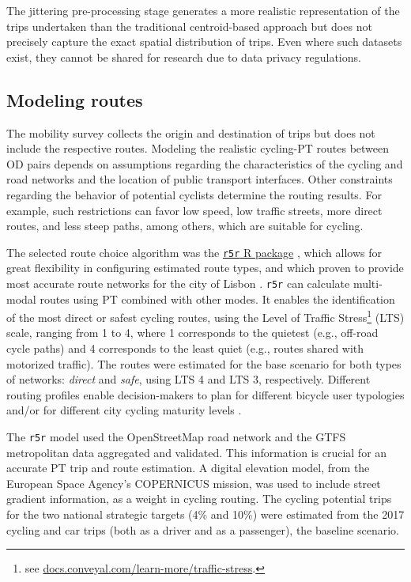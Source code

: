\documentclass[review, doubleblind, 3p,
authoryear]{elsarticle} %
\begin{document}
The jittering pre-processing stage generates a more realistic
representation of the trips undertaken than the traditional
centroid-based approach but does not precisely capture the exact spatial
distribution of trips. Even where such datasets exist, they cannot be
shared for research due to data privacy regulations.

\subsection{Modeling routes}\label{modeling-routes}

The mobility survey collects the origin and destination of trips but
does not include the respective routes. Modeling the realistic
cycling-PT routes between OD pairs depends on assumptions regarding the
characteristics of the cycling and road networks and the location of
public transport interfaces. Other constraints regarding the behavior of
potential cyclists determine the routing results. For example, such
restrictions can favor low speed, low traffic streets, more direct
routes, and less steep paths, among others, which are suitable for
cycling.

The selected route choice algorithm was the
\href{https://ipeagit.github.io/r5r/}{\texttt{r5r} R package}
\citep{r5r}, which allows for great flexibility in configuring estimated
route types, and which proven to provide most accurate route networks
for the city of Lisbon \citep{Lovelace2022exploring}. \texttt{r5r} can
calculate multi-modal routes using PT combined with other modes. It
enables the identification of the most direct or safest cycling routes,
using the Level of Traffic Stress\footnote{see
  \href{https://docs.conveyal.com/learn-more/traffic-stress}{docs.conveyal.com/learn-more/traffic-stress}.}
(LTS) scale, ranging from 1 to 4, where 1 corresponds to the quietest
(e.g., off-road cycle paths) and 4 corresponds to the least quiet (e.g.,
routes shared with motorized traffic). The routes were estimated for the
base scenario for both types of networks: \emph{direct} and \emph{safe},
using LTS 4 and LTS 3, respectively. Different routing profiles enable
decision-makers to plan for different bicycle user typologies and/or for
different city cycling maturity levels \citep{felix2017}.

The \texttt{r5r} model used the OpenStreetMap road network and the GTFS
metropolitan data aggregated and validated. This information is crucial
for an accurate PT trip and route estimation. A digital elevation model,
from the European Space Agency's COPERNICUS mission, was used to include
street gradient information, as a weight in cycling routing. The cycling
potential trips for the two national strategic targets (4\% and 10\%)
were estimated from the 2017 cycling and car trips (both as a driver and
as a passenger), the baseline scenario.
\end{document}
